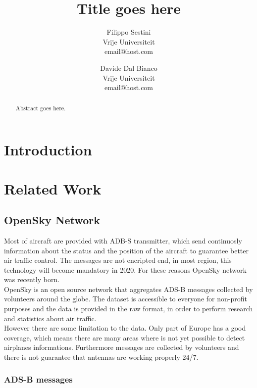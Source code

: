 \documentclass{vldb}
\title{Title goes here}
\author{Filippo Sestini \\ Vrije Universiteit \\ email@host.com \and
  Davide Dal Bianco \\ Vrije Universiteit \\ email@host.com}
\begin{document}
\maketitle

\begin{abstract}
Abstract goes here.  
\end{abstract}

\section{Introduction}

\section{Related Work}

\subsection{OpenSky Network}
Most of aircraft are provided with ADB-S transmitter, which send continuosly information about the status and the position of the aircraft to guarantee better air traffic control. The messages are not encripted end, in most region, this technology will become mandatory in 2020. For these reasons OpenSky network was recently born. \\
OpenSky is an open source network that aggregates ADS-B messages collected by volunteers around the globe. The dataset is accessible to everyone for non-profit purposes and the data is provided in the raw format, in order to perform research and statistics about air traffic. \\
However there are some limitation to the data. Only part of Europe has a good coverage, which means there are many areas where is not yet possible to detect airplanes informations. Furthermore messages are collected by volunteers and there is not guarantee that antennas are working properly 24/7.

    \subsubsection{ADS-B messages}
\end{document}
